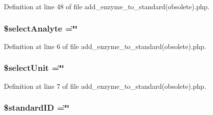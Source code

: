 Definition at line 48 of file add\-\_\-enzyme\-\_\-to\-\_\-standard(obsolete).\-php.

\hypertarget{add__enzyme__to__standard_07obsolete_08_8php_ae5b99d173d7360be6556675a80036269}{
\subsubsection[{\$select\-Analyte}]{\setlength{\rightskip}{0pt plus 5cm}\$select\-Analyte =\char`\"{}\char`\"{}}}\label{add__enzyme__to__standard_07obsolete_08_8php_ae5b99d173d7360be6556675a80036269}


Definition at line 6 of file add\-\_\-enzyme\-\_\-to\-\_\-standard(obsolete).\-php.

\hypertarget{add__enzyme__to__standard_07obsolete_08_8php_a427fdcd2d971a5567fb4d111d8de5f54}{
\subsubsection[{\$select\-Unit}]{\setlength{\rightskip}{0pt plus 5cm}\$select\-Unit =\char`\"{}\char`\"{}}}\label{add__enzyme__to__standard_07obsolete_08_8php_a427fdcd2d971a5567fb4d111d8de5f54}


Definition at line 7 of file add\-\_\-enzyme\-\_\-to\-\_\-standard(obsolete).\-php.

\hypertarget{add__enzyme__to__standard_07obsolete_08_8php_a0c541a369e4a0434108a7d145751bb23}{
\subsubsection[{\$standard\-I\-D}]{\setlength{\rightskip}{0pt plus 5cm}\$standard\-I\-D =\char`\"{}\char`\"{}}}\label{add__enzyme__to__standard_07obsolete_08_8php_a0c541a369e4a0434108a7d145751bb23}


